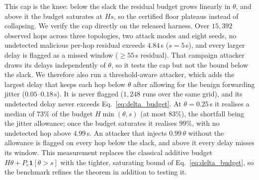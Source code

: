 This cap is the knee: below the slack the residual budget grows linearly in
$\theta$, and above it the budget saturates at $Hs$, so the certified floor
plateaus instead of collapsing. We verify the cap directly on the
released harness. Over $15{,}392$ observed hops across three topologies, two
attack modes and eight seeds, no undetected malicious per-hop residual exceeds
$4.84$\,s ($s=5$\,s), and every larger delay is flagged as a missed window
($\ge55$\,s residual). That campaign attacker draws its delays independently of
$\theta$, so it tests the cap but not the bound below the slack. We therefore
also run a threshold-aware attacker, which adds the largest delay that keeps
each hop below $\theta$ after allowing for the benign forwarding jitter
($0.05$--$0.18$\,s). It is never flagged ($1{,}248$ runs over the same grid),
and its undetected delay never exceeds Eq.~\eqref{eq:delta_budget}. At
$\theta=0.25$\,s it realises a median of $73\%$ of the budget
$H\min(\theta,s)$ (at most $83\%$), the shortfall being the jitter allowance;
once the budget saturates it realises $99\%$, with no undetected hop above
$4.99$\,s. An attacker that injects $0.99\,\theta$ without the allowance is
flagged on every hop below the slack, and above it every delay misses its
window. This measurement replaces the classical additive budget
$H\theta+P_{\!c}\mathbf{1}[\theta>s]$ with the tighter, saturating bound of
Eq.~\eqref{eq:delta_budget}, so the benchmark refines the theorem in addition
to testing it.

